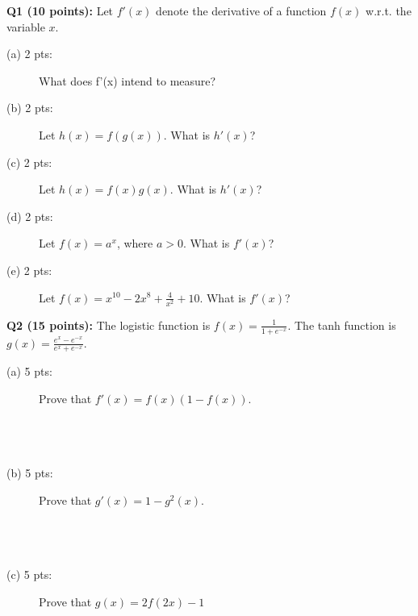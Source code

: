 \documentclass[11pt]{article}
\begin{document}
\vspace{0.4 in}
\noindent
       {\bf Q1 (10 points):} Let $f'(x)$ denote the derivative of a
         function $f(x)$ w.r.t. the variable $x$.
\begin{description}
   \item [(a) 2 pts:] What does f'(x) intend to measure? \\
  
   \item [(b) 2 pts:] Let $h(x)=f(g(x))$. What is $h'(x)$? \\

   \item [(c) 2 pts:] Let $h(x)=f(x)g(x)$. What is $h'(x)$? \\

   \item [(d) 2 pts:] Let $f(x)=a^x$, where $a>0$. What is $f'(x)$? \\

   \item [(e) 2 pts:] Let $f(x)= x^{10}-2x^8 + \frac{4}{x^2} + 10$.
            What is $f'(x)$? \\
\end{description}


\vspace{0.4 in}
\noindent
{\bf Q2 (15 points):} The logistic function is $f(x)=\frac{1}{1+e^{-x}}$.
       The tanh function is $g(x)=\frac{e^x - e^{-x}}{e^x +e^{-x}}$.
    \begin{description}
     \item [(a) 5 pts:] Prove that $f'(x)=f(x)(1-f(x))$. \\ \\ \\ \\
     \item [(b) 5 pts:] Prove that $g'(x)=1 - g^2(x)$. \\  \\ \\ \\  
     \item [(c) 5 pts:] Prove that $g(x) = 2f(2x)-1$  \\  \\ \\ \\
    \end{description}
    
\end{document}
